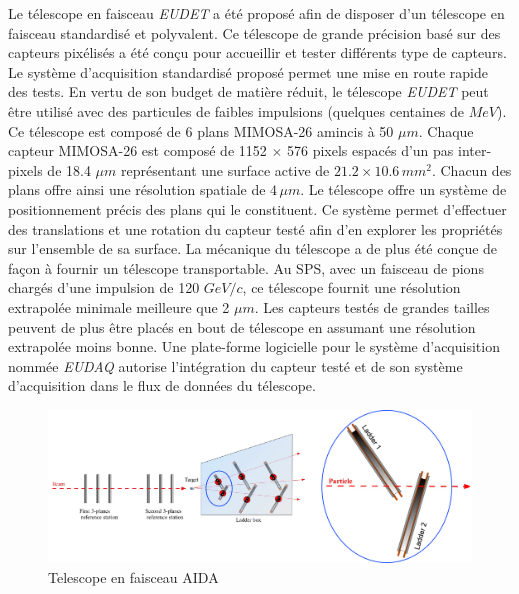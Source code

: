  \medskip

 Le télescope en faisceau \textit{EUDET} \cite{behr2010test} a \'et\'e propos\'e afin de disposer d'un t\'elescope en faisceau standardis\'e et polyvalent. Ce télescope de grande pr\'ecision bas\'e sur des capteurs pix\'elis\'es a \'et\'e con\c{c}u pour accueillir et tester diff\'erents type de capteurs. Le syst\`eme d'acquisition standardis\'e propos\'e permet une mise en route rapide des tests. En vertu de son budget de mati\`ere r\'eduit, le télescope \textit{EUDET} peut \^etre utilis\'e avec des particules de faibles impulsions (quelques centaines de $MeV$). Ce t\'elescope est compos\'e de 6 plans MIMOSA-26 amincis \`a 50 $\mu m$. Chaque capteur MIMOSA-26 est compos\'e de 1152 $\times$ 576 pixels espac\'es d'un pas inter-pixels de 18.4 $\mu m$ repr\'esentant une surface active de $21.2 \times 10.6 \, mm^2$. Chacun des plans offre ainsi une r\'esolution spatiale de $4 \, \mu m$. Le t\'elescope offre un syst\`eme de positionnement pr\'ecis des plans qui le constituent. Ce syst\`eme permet d'effectuer des translations et une rotation du capteur test\'e afin d'en explorer les propri\'et\'es sur l'ensemble de sa surface. La m\'ecanique du t\'elescope a de plus \'et\'e con\c{c}ue de fa\c{c}on à fournir un t\'elescope transportable. Au SPS, avec un faisceau de pions charg\'es d'une impulsion de 120 $GeV/c$, ce t\'elescope fournit une r\'esolution extrapol\'ee minimale meilleure que 2 $\mu m$. Les capteurs test\'es de grandes tailles peuvent de plus \^etre plac\'es en bout de t\'elescope en assumant une r\'esolution extrapol\'ee moins bonne. Une plate-forme logicielle pour le syst\`eme d'acquisition nomm\'ee \textit{EUDAQ} autorise l'int\'egration du capteur test\'e et de son syst\`eme d'acquisition dans le flux de donn\'ees du télescope.

 
   \begin{figure}[!htb]
    \begin{center} 
      \includegraphics[scale=0.30]{./figures/AIDA_telescope.png}
      \caption{Telescope en faisceau AIDA}
      \label{fig:AIDA_tel}
    \end{center}
  \end{figure}
 
